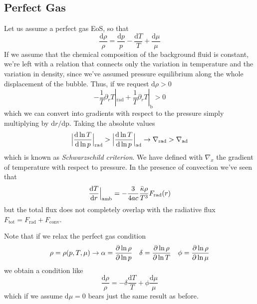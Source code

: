 \subsection*{Perfect Gas}
Let us assume a perfect gas EoS, so that 
\begin{equation*}
	\frac{\text{d}\rho}{\rho} = \frac{\text{d}p}{p} - \frac{\text{d}T}{T}+\frac{\text{d}\mu}{\mu}
\end{equation*}
If we assume that the chemical composition of the background fluid is constant, we're left with a relation that connects only the variation in temperature and the variation in density, since we've assumed pressure equilibrium along the whole displacement of the bubble. Thus, if we request $\text{d}\rho > 0$ 
\begin{equation*}
	-\frac{1}{T}\partial_{r}T|_{\text{rad}} + \frac{1}{T}\partial_{r}T|_{\text{b}} > 0
\end{equation*}
which we can convert into gradients with respect to the pressure simply multiplying by $\text{d}r/\text{dp}$. Taking the absolute values 
\begin{equation}
	\Big|\frac{\text{d}\ln T}{\text{d}\ln p}\Big|_{\text{rad}} > \Big|\frac{\text{d}\ln T}{\text{d}\ln p}\Big|_{\text{ad}} \to \nabla_{\text{rad}} > \nabla_{\text{ad}}
	\label{eq:Schwartzschildcriterion} 
\end{equation}
which is known as \emph{Schwarzschild criterion}. We have defined with $\nabla_{x}$ the gradient of temperature with respect to pressure. In the presence of convection we've seen that 
\begin{equation*}
	\frac{\text{d}T}{\text{d}r}\Big|_{\text{amb}} = -\frac{3}{4ac}\frac{\bar{\kappa}\rho}{T^{3}}F_{\text{rad}}(r)
\end{equation*}
but the total flux does not completely overlap with the radiative flux $F_{\text{tot}} = F_{\text{rad}}+F_{\text{conv}}$.
\par Note that if we relax the perfect gas condition
\begin{equation*}
	\rho = \rho(p,T,\mu) \to \alpha = \frac{\partial \ln \rho}{\partial \ln p} \quad \delta = \frac{\partial \ln \rho}{\partial \ln T} \quad \phi = \frac{\partial \ln \rho}{\partial \ln \mu}
\end{equation*}
we obtain a condition like
\begin{equation*}
	\frac{\text{d}\rho}{\rho} = -\delta \frac{\text{d}T}{T}+\phi\frac{\text{d}\mu}{\mu}
\end{equation*}
which if we assume $\text{d}\mu = 0$ bears just the same result as before.
